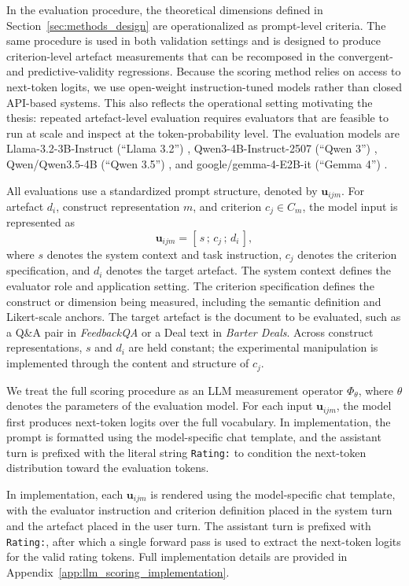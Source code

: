 In the evaluation procedure, the theoretical dimensions defined in Section~\ref{sec:methods_design} are operationalized as prompt-level criteria. The same procedure is used in both validation settings and is designed to produce criterion-level artefact measurements that can be recomposed in the convergent- and predictive-validity regressions. Because the scoring method relies on access to next-token logits, we use open-weight instruction-tuned models rather than closed API-based systems. This also reflects the operational setting motivating the thesis: repeated artefact-level evaluation requires evaluators that are feasible to run at scale and inspect at the token-probability level. The evaluation models are Llama-3.2-3B-Instruct (``Llama 3.2'') \citep{metaLlama323BInstruct2024}, Qwen3-4B-Instruct-2507 (``Qwen 3'') \citep{qwen3technicalreport}, Qwen/Qwen3.5-4B (``Qwen 3.5'') \citep{qwen35_4b_modelcard}, and google/gemma-4-E2B-it (``Gemma 4'') \citep{googleGemma4E2BIt2026}.

All evaluations use a standardized prompt structure, denoted by $\mathbf{u}_{ijm}$. For artefact $d_i$, construct representation $m$, and criterion $c_j \in C_m$, the model input is represented as
\[
    \mathbf{u}_{ijm} = [\, s \,;\, c_j \,;\, d_i \,],
\]
where $s$ denotes the system context and task instruction, $c_j$ denotes the criterion specification, and $d_i$ denotes the target artefact. The system context defines the evaluator role and application setting. The criterion specification defines the construct or dimension being measured, including the semantic definition and Likert-scale anchors. The target artefact is the document to be evaluated, such as a Q\&A pair in \textit{FeedbackQA} or a Deal text in \textit{Barter Deals}. Across construct representations, $s$ and $d_i$ are held constant; the experimental manipulation is implemented through the content and structure of $c_j$.

We treat the full scoring procedure as an LLM measurement operator $\Phi_\theta$, where $\theta$ denotes the parameters of the evaluation model. For each input $\mathbf{u}_{ijm}$, the model first produces next-token logits over the full vocabulary. In implementation, the prompt is formatted using the model-specific chat template, and the assistant turn is prefixed with the literal string \texttt{Rating:} to condition the next-token distribution toward the evaluation tokens. 


In implementation, each $\mathbf{u}_{ijm}$ is rendered using the model-specific chat template, with the evaluator instruction and criterion definition placed in the system turn and the artefact placed in the user turn. The assistant turn is prefixed with \texttt{Rating:}, after which a single forward pass is used to extract the next-token logits for the valid rating tokens. Full implementation details are provided in Appendix~\ref{app:llm_scoring_implementation}.

